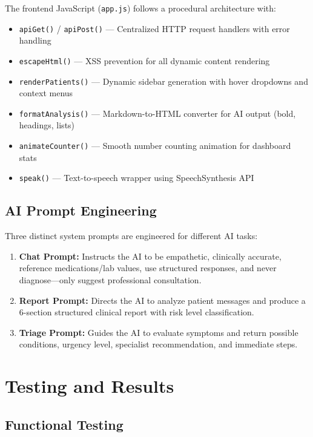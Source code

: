 \documentclass[12pt,a4paper]{report}
\begin{document}
The frontend JavaScript (\texttt{app.js}) follows a procedural architecture with:

\begin{itemize}
    \item \texttt{apiGet()} / \texttt{apiPost()} --- Centralized HTTP request handlers with error handling
    \item \texttt{escapeHtml()} --- XSS prevention for all dynamic content rendering
    \item \texttt{renderPatients()} --- Dynamic sidebar generation with hover dropdowns and context menus
    \item \texttt{formatAnalysis()} --- Markdown-to-HTML converter for AI output (bold, headings, lists)
    \item \texttt{animateCounter()} --- Smooth number counting animation for dashboard stats
    \item \texttt{speak()} --- Text-to-speech wrapper using SpeechSynthesis API
\end{itemize}

\section{AI Prompt Engineering}

Three distinct system prompts are engineered for different AI tasks:

\begin{enumerate}
    \item \textbf{Chat Prompt:} Instructs the AI to be empathetic, clinically accurate, reference medications/lab values, use structured responses, and never diagnose---only suggest professional consultation.
    \item \textbf{Report Prompt:} Directs the AI to analyze patient messages and produce a 6-section structured clinical report with risk level classification.
    \item \textbf{Triage Prompt:} Guides the AI to evaluate symptoms and return possible conditions, urgency level, specialist recommendation, and immediate steps.
\end{enumerate}

\chapter{Testing and Results}

\section{Functional Testing}
\end{document}
